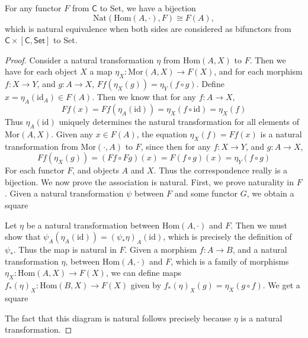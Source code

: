 \begin{theorem}[Yoneda]
    For any functor $F$ from $\mathsf{C}$ to {\sf Set}, we have a bijection
    \[ \text{Nat}(\text{Hom}(A,\cdot),F) \cong F(A), \]
    which is natural equivalence when both sides are considered as bifunctors from $\mathsf{C} \times [\mathsf{C},\mathsf{Set}]$ to {\sf Set}.
\end{theorem}
\begin{proof}
    Consider a natural transformation $\eta$ from $\text{Hom}(A,X)$ to $F$. Then we have for each object $X$ a map $\eta_X: \text{Mor}(A,X) \to F(X)$, and for each morphism $f: X \to Y$, and $g: A \to X$, $Ff(\eta_X(g)) = \eta_Y(f \circ g)$. Define $x = \eta_A(\text{id}_A) \in F(A)$. Then we know that for any $f: A \to X$,
    \[ Ff(x) = Ff(\eta_A(\text{id})) = \eta_X(f \circ \text{id}) = \eta_X(f) \]
    Thus $\eta_A(\text{id})$ uniquely determines the natural transformation for all elements of $\text{Mor}(A,X)$. Given any $x \in F(A)$, the equation $\eta_X(f) = Ff(x)$ is a natural transformation from $\text{Mor}(\cdot,A)$ to $F$, since then for any $f: X \to Y$, and $g: A \to X$,
    \[ Ff(\eta_X(g)) = (Ff \circ Fg)(x) = F(f \circ g)(x) = \eta_Y(f \circ g) \]
    For each functor $F$, and objects $A$ and $X$. Thus the correspondence really is a bijection. We now prove the association is natural. First, we prove naturality in $F$. Given a natural transformation $\psi$ between $F$ and some functor $G$, we obtain a square
    \begin{center}
    \end{center}
    Let $\eta$ be a natural transformation between $\text{Hom}(A,\cdot)$ and $F$. Then we must show that $\psi_A(\eta_A(\text{id})) = (\psi_* \eta)_A(\text{id})$, which is precisely the definition of $\psi_*$. Thus the map is natural in $F$. Given a morphism $f: A \to B$, and a natural transformation $\eta$, between $\text{Hom}(A,\cdot)$ and $F$, which is a family of morphisms $\eta_X: \text{Hom}(A,X) \to F(X)$, we can define maps $f_*(\eta)_X: \text{Hom}(B,X) \to F(X)$ given by $f_*(\eta)_X(g) = \eta_X(g \circ f)$. We get a square
    \begin{center}
    \end{center}
    The fact that this diagram is natural follows precisely because $\eta$ is a natural transformation.
\end{proof}

